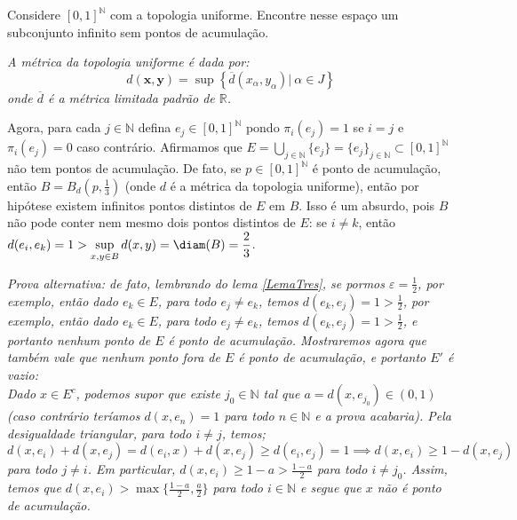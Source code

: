\begin{Mybox}
Considere $[0, 1]^{\mathbb{N}}$ com a topologia uniforme. Encontre nesse espaço um subconjunto infinito sem pontos de acumulação.
\vspace{-.4cm}
\end{Mybox}
\vspace{-.5cm}
\begin{dem}
 \begin{oobs}
    \textit{A métrica da topologia uniforme é dada por:
    $$d ( \mathbf { x } , \mathbf { y } ) = \sup \left\{ \overline { d } \left( x _ { \alpha } , y _ { \alpha } \right) | \ \alpha \in J \right\}$$
    onde $\overline{d}$ é a métrica limitada padrão de $\mathbb{R}$.}
    \end{oobs}
    Agora, para cada $j \in \mathbb{N}$ defina $e_j \in [0,1]^{\mathbb{N}}$ pondo $\pi_i(e_j) = 1$ se $i = j$ e $\pi_i(e_j) = 0$ caso contrário. Afirmamos que $E = \displaystyle{\bigcup_{j \in \mathbb{N}} \{e_j \}} = \{e_j \}_{j \in \mathbb{N}}\subset [0,1]^{\mathbb{N}} $ não tem pontos de acumulação. De fato, se $p \in [0,1]^{\mathbb{N}}$ é ponto de acumulação, então $B = B_d\left(p, \frac{1}{3} \right)$ (onde $d$ é a métrica da topologia uniforme), então por hipótese existem infinitos pontos distintos de $E$ em $B$. Isso é um absurdo, pois $B$ não pode conter nem mesmo dois pontos distintos de $E$: se $i \neq k$, então $d(e_i, e_k) = 1 > \displaystyle{\sup_{x, y \in B} d(x, y) } = \diam(B) = \frac{2}{3}$. \par
    
    \textit{Prova alternativa: de fato, lembrando do lema \cref{LemaTres}, se pormos $\varepsilon = \frac{1}{2}$, por exemplo, então dado $e_k \in E$, para todo $e_j \neq e_k$, temos $d(e_k, e_j) = 1 > \frac{1}{2}$, por exemplo, então dado $e_k \in E$, para todo $e_j \neq e_k$, temos $d(e_k, e_j) = 1 > \frac{1}{2}$, e portanto nenhum ponto de $E$ é ponto de acumulação. Mostraremos agora que também vale que nenhum ponto fora de $E$ é ponto de acumulação, e portanto $E'$ é vazio: 
    \\
    Dado $x \in E^c$, podemos supor que existe $j_0 \in \mathbb{N}$ tal que $a = d(x, e_{j_0}) \in (0,1)$  (caso contrário teríamos $d(x, e_n) = 1$ para todo $n \in \mathbb{N}$ e a prova acabaria). Pela desigualdade triangular, para todo $i \neq j$, temos; $$d(x, e_i) + d(x, e_j) = d(e_i, x) + d(x, e_j) \geq d(e_i, e_j) = 1 \implies d(x, e_i ) \geq 1 - d(x,e_j)$$ para todo $j \neq i$. Em particular, $d(x, e_i) \geq 1 - a > \frac{1-a}{2}$ para todo $i \neq j_0$. Assim, temos que $d(x, e_i) > \max\{\frac{1-a}{2}, \frac{a}{2} \}$ para todo $i \in \mathbb{N}$ e segue que $x$ não é ponto de acumulação.}
\end{dem}


